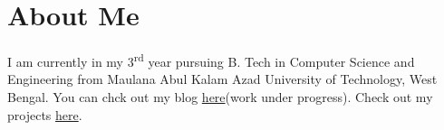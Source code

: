 \documentclass[a4paper]{article}
\newcommand\nrd{\textsuperscript{rd}\xspace}
\begin{document}
\section*{About Me}
\hspace{20pt}I am currently in my 3\nrd year pursuing B. Tech in Computer Science and Engineering from Maulana Abul Kalam Azad University of Technology, West Bengal. You can chck out my blog \href{https://mouri11.github.io/}{here}(work under progress). Check out my projects \href{https://github.com/mouri11}{here}.


\end{document}

